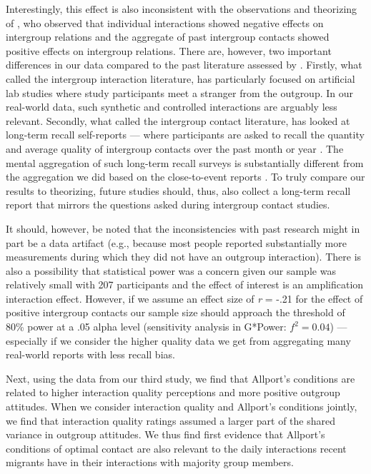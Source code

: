 \documentclass[man, 12pt, a4paper, mask]{apa7}
\theoremstyle{break}
\theoremstyle{plain}
\begin{document}
Interestingly, this effect is also inconsistent with the observations and theorizing of \citet[][]{MacInnis2015}, who observed that individual interactions showed negative effects on intergroup relations and the aggregate of past intergroup contacts showed positive effects on intergroup relations. There are, however, two important differences in our data compared to the past literature assessed by \citeauthor{MacInnis2015}. Firstly, what \citeauthor{MacInnis2015} called the intergroup interaction literature, has particularly focused on artificial lab studies where study participants meet a stranger from the outgroup. In our real-world data, such synthetic and controlled interactions are arguably less relevant. Secondly, what \citeauthor{MacInnis2015} called the intergroup contact literature, has looked at long-term recall self-reports --- where participants are asked to recall the quantity and average quality of intergroup contacts over the past month or year \citep{MacInnis2015}. The mental aggregation of such long-term recall surveys is substantially different from the aggregation we did based on the close-to-event reports \citep[][]{shiffman2008}. To truly compare our results to \citet[][]{MacInnis2015} theorizing, future studies should, thus, also collect a long-term recall report that mirrors the questions asked during intergroup contact studies.

It should, however, be noted that the inconsistencies with past research might in part be a data artifact (e.g., because most people reported substantially more measurements during which they did not have an outgroup interaction). There is also a possibility that statistical power was a concern given our sample was relatively small with 207 participants and the effect of interest is an amplification interaction effect. However, if we assume an effect size of \textit{r} = -.21 for the effect of positive intergroup contacts \citep[see][]{Pettigrew2006} our sample size should approach the threshold of 80\% power at a .05 alpha level (sensitivity analysis in G*Power: $f^2 = 0.04$) --- especially if we consider the higher quality data we get from aggregating many real-world reports with less recall bias. 

Next, using the data from our third study, we find that Allport's conditions are related to higher interaction quality perceptions and more positive outgroup attitudes. When we consider interaction quality and Allport's conditions jointly, we find that interaction quality ratings assumed a larger part of the shared variance in outgroup attitudes. We thus find first evidence that Allport's conditions of optimal contact are also relevant to the daily interactions recent migrants have in their interactions with majority group members. 
\end{document}
